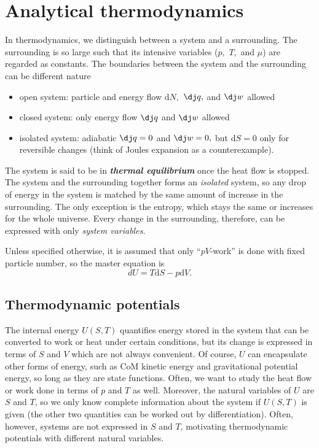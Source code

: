 \documentclass{article}
\theoremstyle{nonumberplain}
\begin{document}
\section{Analytical thermodynamics}
In thermodynamics, we distinguish between a system and a surrounding. The surrounding is so large such that its intensive variables ($p,$ $T,$ and $\mu $) are regarded as constants. The boundaries between the system and the surrounding can be different nature 
\begin{itemize}
    \item open system: particle and energy flow $\mathrm{d} N,$ $\mathrm{\dj}q,$ and $\mathrm{\dj}w $ allowed
    \item closed system: only energy flow $\mathrm{\dj}q $ and $\mathrm{\dj}w $ allowed 
    \item isolated system: adiabatic $\mathrm{\dj} q = 0$ and $\mathrm{\dj}w  =0,$ but $\mathrm{d} S = 0$ only for reversible changes (think of Joules expansion as a counterexample).
\end{itemize}
The system is said to be in \textit{\textbf{thermal equilibrium}} once the heat flow is stopped. The system and the surrounding together forms an \textit{isolated} system, so any drop of energy in the system is matched by the same amount of increase in the surrounding. The only exception is the entropy, which stays the same or increases for the whole universe. Every change in the surrounding, therefore, can be expressed with only \textit{system variables.}

Unless specified otherwise, it is assumed that only ``$pV$-work'' is done with fixed particle number, so the master equation is 
\[
    dU = T \mathrm{d} S - p \mathrm{d} V. 
\]
\subsection{Thermodynamic potentials}
The internal energy $U(S,T)$ quantifies energy stored in the system that can be converted to work or heat under certain conditions, but its change is expressed in terms of $S$ and $V$ which are not always convenient. Of course, $U$ can encapsulate other forms of energy, such as CoM kinetic energy and gravitational potential energy, so long as they are state functions. Often, we want to study the heat flow or work done in terms of $p$ and $T$ as well. Moreover, the natural variables of $U$ are $S$ and $T$, so we only know complete information about the system if $U(S,T)$ is given (the other two quantities can be worked out by differentiation). Often, however, systems are not expressed in $S$ and $T$, motivating thermodynamic potentials with different natural variables. 
\end{document}

